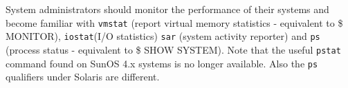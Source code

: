 System administrators should monitor the performance of their systems and
become familiar with {\tt vmstat} (report virtual memory statistics -
equivalent to \$ MONITOR),  {\tt iostat}(I/O statistics)
{\tt sar} (system activity reporter) and {\tt ps}
(process status - equivalent to  \$ SHOW SYSTEM). Note that the useful
{\tt pstat} command found on SunOS 4.x systems is no longer available.
Also the {\tt ps} qualifiers under Solaris are different.


